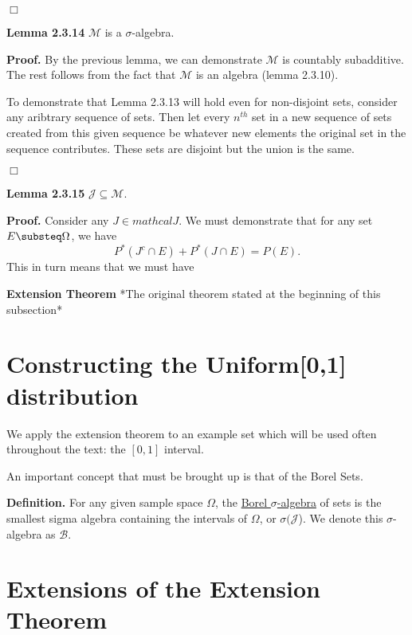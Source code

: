 \documentclass{article}
\begin{document}
\hfill $\Box$

\medskip

\noindent \textbf{Lemma 2.3.14} $\mathcal{M}$ is a $\sigma$-algebra. 

\medskip

\noindent \textbf{Proof.} By the previous lemma, we can demonstrate $\mathcal{M}$ is countably subadditive. The rest follows from the fact that $\mathcal{M}$ is an algebra (lemma 2.3.10).

To demonstrate that Lemma 2.3.13 will hold even for non-disjoint sets, consider any aribtrary sequence of sets. Then let every $n^{th}$ set in a new sequence of sets created from this given sequence be whatever new elements the original set in the sequence contributes. These sets are disjoint but the union is the same. 

\hfill $\Box$

\medskip

\noindent \textbf{Lemma 2.3.15} $\mathcal{J} \subseteq \mathcal{M}$. 

\medskip

\noindent \textbf{Proof.} Consider any $J \in mathcal{J}$. We must demonstrate that for any set $E \substeq \Omega$, we have \[P^*(J^c \cap E) + P^*(J \cap E) = P(E).\] This in turn means that we must have 

\bigskip 

\noindent \textbf{Extension Theorem} *The original theorem stated at the beginning of this subsection*


\section{Constructing the Uniform[0,1] distribution}

We apply the extension theorem to an example set which will be used often throughout the text: the 
$[0,1]$ interval. 

An important concept that must be brought up is that of the Borel Sets.

\noindent \textbf{Definition.} For any given sample space $\Omega$, the \underline{Borel $\sigma$-algebra} of sets is the smallest sigma algebra containing the intervals of $\Omega$, or $\sigma(\mathcal{J}$). We denote this $\sigma$-algebra as $\mathcal{B}$. 


\section{Extensions of the Extension Theorem}
\end{document}
